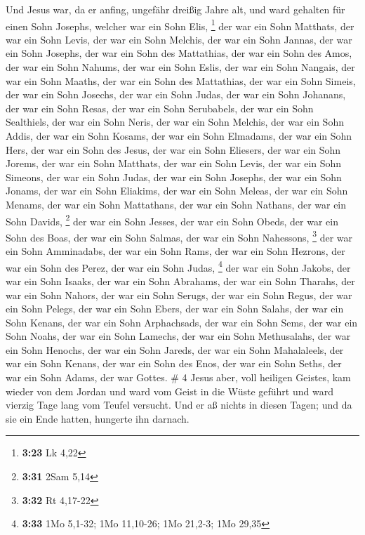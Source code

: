  Und Jesus war, da er anfing, ungefähr dreißig Jahre alt,
und ward gehalten für einen Sohn Josephs, welcher war ein Sohn Elis,
\footnote{\textbf{3:23} Lk 4,22}  der war ein Sohn
Matthats, der war ein Sohn Levis, der war ein Sohn Melchis, der war ein
Sohn Jannas, der war ein Sohn Josephs,  der war ein Sohn
des Mattathias, der war ein Sohn des Amos, der war ein Sohn Nahums, der
war ein Sohn Eslis, der war ein Sohn Nangais,  der war ein
Sohn Maaths, der war ein Sohn des Mattathias, der war ein Sohn Simeis,
der war ein Sohn Josechs, der war ein Sohn Judas,  der war
ein Sohn Johanans, der war ein Sohn Resas, der war ein Sohn Serubabels,
der war ein Sohn Sealthiels, der war ein Sohn Neris,  der
war ein Sohn Melchis, der war ein Sohn Addis, der war ein Sohn Kosams,
der war ein Sohn Elmadams, der war ein Sohn Hers,  der war
ein Sohn des Jesus, der war ein Sohn Eliesers, der war ein Sohn Jorems,
der war ein Sohn Matthats, der war ein Sohn Levis,  der war
ein Sohn Simeons, der war ein Sohn Judas, der war ein Sohn Josephs, der
war ein Sohn Jonams, der war ein Sohn Eliakims,  der war
ein Sohn Meleas, der war ein Sohn Menams, der war ein Sohn Mattathans,
der war ein Sohn Nathans, der war ein Sohn Davids, \footnote{\textbf{3:31}
  2Sam 5,14}  der war ein Sohn Jesses, der war ein Sohn
Obeds, der war ein Sohn des Boas, der war ein Sohn Salmas, der war ein
Sohn Nahessons, \footnote{\textbf{3:32} Rt 4,17-22}  der
war ein Sohn Amminadabs, der war ein Sohn Rams, der war ein Sohn
Hezrons, der war ein Sohn des Perez, der war ein Sohn Judas, \footnote{\textbf{3:33}
  1Mo 5,1-32; 1Mo 11,10-26; 1Mo 21,2-3; 1Mo 29,35}  der war
ein Sohn Jakobs, der war ein Sohn Isaaks, der war ein Sohn Abrahams, der
war ein Sohn Tharahs, der war ein Sohn Nahors,  der war ein
Sohn Serugs, der war ein Sohn Regus, der war ein Sohn Pelegs, der war
ein Sohn Ebers, der war ein Sohn Salahs,  der war ein Sohn
Kenans, der war ein Sohn Arphachsads, der war ein Sohn Sems, der war ein
Sohn Noahs, der war ein Sohn Lamechs,  der war ein Sohn
Methusalahs, der war ein Sohn Henochs, der war ein Sohn Jareds, der war
ein Sohn Mahalaleels, der war ein Sohn Kenans,  der war ein
Sohn des Enos, der war ein Sohn Seths, der war ein Sohn Adams, der war
Gottes. \# 4  Jesus aber, voll heiligen Geistes, kam wieder
von dem Jordan und ward vom Geist in die Wüste geführt  und
ward vierzig Tage lang vom Teufel versucht. Und er aß nichts in diesen
Tagen; und da sie ein Ende hatten, hungerte ihn darnach.

